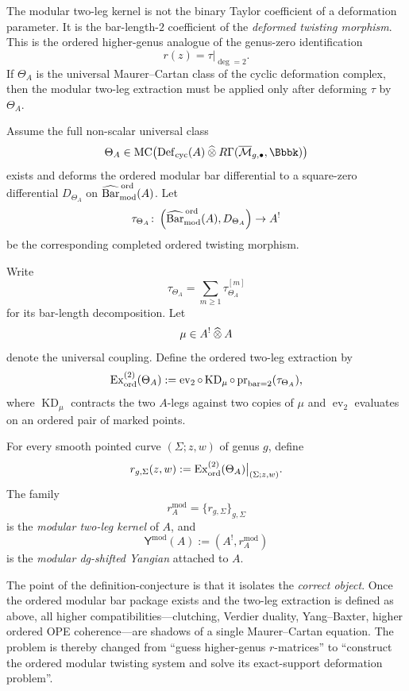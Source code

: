 \begin{remark}
\label{rem:correct-two-leg-extraction}
The modular two-leg kernel is not the binary Taylor coefficient of a deformation parameter.
It is the bar-length-$2$ coefficient of the \emph{deformed twisting morphism}. This is the ordered
higher-genus analogue of the genus-zero identification
\[
r(z)=\tau|_{\deg=2}.
\]
If $\Theta_A$ is the universal Maurer--Cartan class of the cyclic deformation complex, then the
modular two-leg extraction must be applied only after deforming $\tau$ by $\Theta_A$.
\end{remark}

\begin{definition}
\label{defconj:ordered-modular-two-leg-extraction}
Assume the full non-scalar universal class
\[
\Theta_A\in
\MC\!\left(\Def_{\mathrm{cyc}}(A)\bigtensor R\Gamma(\overline{\mathcal M}_{g,\bullet},\Bbbk)\right)
\]
exists and deforms the ordered modular bar differential to a square-zero differential
$D_{\Theta_A}$ on $\widehat{\mathrm{Bar}}^{\,\mathrm{ord}}_{\mathrm{mod}}(A)$.
Let
\[
\tau_{\Theta_A}\colon
\left(\widehat{\mathrm{Bar}}^{\,\mathrm{ord}}_{\mathrm{mod}}(A),D_{\Theta_A}\right)\to A^!
\]
be the corresponding completed ordered twisting morphism.

Write
\[
\tau_{\Theta_A}=\sum_{m\ge 1}\tau_{\Theta_A}^{[m]}
\]
for its bar-length decomposition. Let
\[
\mu\in A^!\mathbin{\widehat{\otimes}} A
\]
denote the universal coupling. Define the ordered two-leg extraction by
\[
\mathrm{Ex}^{(2)}_{\mathrm{ord}}(\Theta_A)
:=
\operatorname{ev}_2\circ \operatorname{KD}_{\mu}\circ
\operatorname{pr}_{\mathrm{bar}=2}(\tau_{\Theta_A}),
\]
where $\operatorname{KD}_{\mu}$ contracts the two $A$-legs against two copies of $\mu$ and
$\operatorname{ev}_2$ evaluates on an ordered pair of marked points.

For every smooth pointed curve $(\Sigma;z,w)$ of genus $g$, define
\[
r_{g,\Sigma}(z,w)
:=
\mathrm{Ex}^{(2)}_{\mathrm{ord}}(\Theta_A)\big|_{(\Sigma;z,w)}.
\]
The family
\[
r_A^{\mathrm{mod}}=\{r_{g,\Sigma}\}_{g,\Sigma}
\]
is the \emph{modular two-leg kernel} of $A$, and
\[
\mathsf Y^{\mathrm{mod}}(A):=(A^!,r_A^{\mathrm{mod}})
\]
is the \emph{modular dg-shifted Yangian} attached to $A$.
\end{definition}

\begin{remark}
The point of the definition-conjecture is that it isolates the \emph{correct object}.
Once the ordered modular bar package exists and the two-leg extraction is defined as above, all
higher compatibilities---clutching, Verdier duality, Yang--Baxter, higher ordered OPE coherence---are
shadows of a single Maurer--Cartan equation. The problem is thereby changed from
``guess higher-genus $r$-matrices'' to ``construct the ordered modular twisting system and solve its
exact-support deformation problem''.
\end{remark}

